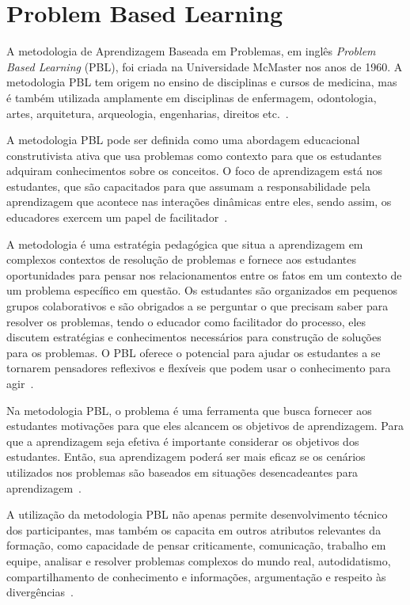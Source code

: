 \section{Problem Based Learning}
\label{sec-revisao-pbl}
A metodologia de Aprendizagem Baseada em Problemas, em
inglês \textit{Problem Based Learning} (PBL),
foi criada na Universidade McMaster nos anos de 1960.
A metodologia \ac{PBL} tem origem no ensino de disciplinas e cursos de medicina,
mas é também utilizada amplamente em disciplinas de enfermagem,
odontologia, artes, arquitetura, arqueologia, engenharias, direitos
etc.~\cite{albanese2010problem, amos1998problem}.

A metodologia \ac{PBL} pode ser definida como uma abordagem educacional
construtivista ativa que usa problemas como contexto para que os estudantes
adquiram conhecimentos sobre os conceitos. O foco de aprendizagem está
nos estudantes, que são capacitados para que assumam a responsabilidade pela
aprendizagem que acontece nas interações dinâmicas
entre eles, sendo assim, os educadores exercem um papel
de facilitador~\cite{dolmans2005problem, albanese2010problem,
amos1998problem, forsythe2002problem}.

A metodologia é uma estratégia pedagógica que situa a aprendizagem em
complexos contextos de resolução de problemas e fornece aos estudantes
oportunidades para pensar nos relacionamentos
entre os fatos em um contexto de um problema específico em questão.
Os estudantes são organizados em pequenos grupos colaborativos e 
são obrigados a se perguntar o que precisam saber para
resolver os problemas, tendo o educador como facilitador do processo, eles
discutem estratégias e conhecimentos necessários para construção de soluções
para os problemas.
O \ac{PBL} oferece o potencial para ajudar os estudantes a se tornarem
pensadores reflexivos e flexíveis que podem usar o conhecimento
para agir~\cite{hmelo2004problem}.

Na metodologia \ac{PBL}, o problema é uma ferramenta que busca fornecer
aos estudantes motivações para que eles alcancem os
objetivos de aprendizagem.
Para que a aprendizagem seja efetiva é importante considerar os objetivos
dos estudantes.
Então, sua aprendizagem poderá ser mais eficaz se os cenários utilizados
nos problemas são baseados em situações desencadeantes para
aprendizagem~\cite{wood2003problem, o2012practical, amos1998problem}.

A utilização da metodologia \ac{PBL} não apenas permite desenvolvimento
técnico dos participantes, mas também os capacita em outros
atributos relevantes da formação, como capacidade de pensar
criticamente, comunicação, trabalho em equipe,
analisar e resolver problemas complexos do mundo real,
autodidatismo, compartilhamento de conhecimento e informações,
argumentação e respeito às
divergências~\cite{wood2003problem, savery2015overview}.

